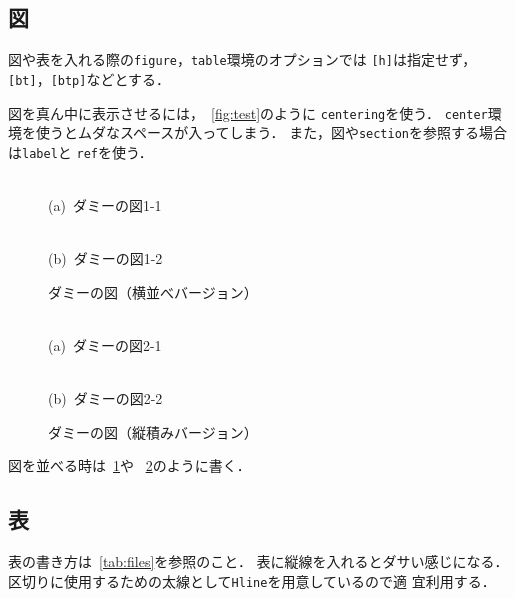 \subsection{図}

図や表を入れる際の\texttt{figure}，\texttt{table}環境のオプションでは
\texttt{[h]}は指定せず，\texttt{[bt]}，\texttt{[btp]}などとする．

図を真ん中に表示させるには，\figurename~\ref{fig:test}のように
\texttt{\yen centering}を使う．
\texttt{center}環境を使うとムダなスペースが入ってしまう．
また，図や\texttt{section}を参照する場合は\texttt{\yen label}と
\texttt{\yen ref}を使う．

\begin{figure}[bt]
 \centering
 \begin{minipage}[b]{0.49\hsize}
  \centering
  \fbox{\rule{0pt}{2cm}\rule{0.4\figurewidth}{0pt}}\\
  (a)~ダミーの図1-1
 \end{minipage}
 \hfill
 \begin{minipage}[b]{0.49\hsize}
  \centering
  \fbox{\rule{0pt}{2cm}\rule{0.4\figurewidth}{0pt}}\\
  (b)~ダミーの図1-2
 \end{minipage}
 \caption{ダミーの図（横並べバージョン）}
 \label{fig_intro:dummy_fig1}
\end{figure}

\begin{figure}[bt]
 \centering
 \fbox{\rule{0.8\hsize}{0pt}\rule{0pt}{2cm}}\\
 (a)~ダミーの図2-1
 \vspace{\figuresep}

 \fbox{\rule{0.8\hsize}{0pt}\rule{0pt}{2cm}}\\
 (b)~ダミーの図2-2
 \caption{ダミーの図（縦積みバージョン）}
 \label{fig_intro:dummy_fig2}
\end{figure}

図を並べる時は\figurename~\ref{fig_intro:dummy_fig1}や
\figurename~\ref{fig_intro:dummy_fig2}のように書く．

\subsection{表}

表の書き方は\tablename~\ref{tab:files}を参照のこと．
表に縦線を入れるとダサい感じになる．
区切りに使用するための太線として\texttt{\yen Hline}を用意しているので適
宜利用する．

